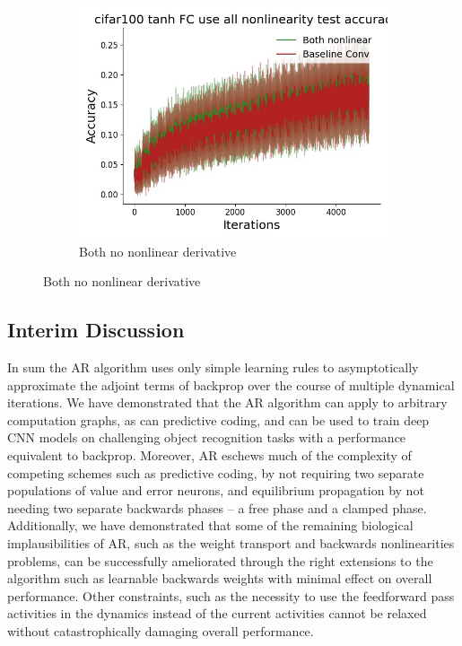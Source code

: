 \begin{figure}[htb]
\begin{subfigure}{0.25\textwidth}
  \includegraphics[width=\linewidth]{chapter_6_figures/AR/cifar100_tanh_FC_use_all_nonlinearity_test_accuracies_prelim_1.jpg}
  \caption{Both no nonlinear derivative}
\end{subfigure}
\end{figure}


\subsection{Interim Discussion}

In sum the AR algorithm uses only simple learning rules to asymptotically approximate the adjoint terms of backprop over the course of multiple dynamical iterations. We have demonstrated that the AR algorithm can apply to arbitrary computation graphs, as can predictive coding, and can be used to train deep CNN models on challenging object recognition tasks with a performance equivalent to backprop. Moreover, AR eschews much of the complexity of competing schemes such as predictive coding, by not requiring two separate populations of value and error neurons, and equilibrium propagation by not needing two separate backwards phases -- a free phase and a clamped phase. Additionally, we have demonstrated that some of the remaining biological implausibilities of AR, such as the weight transport and backwards nonlinearities problems, can be successfully ameliorated through the right extensions to the algorithm such as learnable backwards weights with minimal effect on overall performance. Other constraints, such as the necessity to use the feedforward pass activities in the dynamics instead of the current activities cannot be relaxed without catastrophically damaging overall performance.

